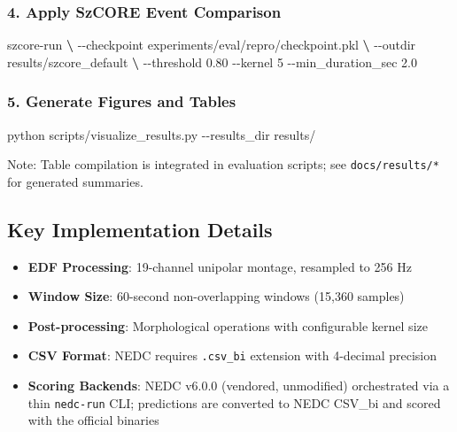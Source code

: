 \documentclass[
]{article}
\newenvironment{Shaded}{}{}
\newcommand{\ExtensionTok}[1]{#1}
\newcommand{\KeywordTok}[1]{\textcolor[rgb]{0.00,0.44,0.13}{\textbf{#1}}}
\newcommand{\NormalTok}[1]{#1}
\providecommand{\tightlist}{%
  \setlength{\itemsep}{0pt}\setlength{\parskip}{0pt}}
\begin{document}
\hypertarget{apply-szcore-event-comparison}{%
\subsubsection{4. Apply SzCORE Event
Comparison}\label{apply-szcore-event-comparison}}

\begin{Shaded}
\begin{Highlighting}[]
\ExtensionTok{szcore{-}run} \KeywordTok{\textbackslash{}}
  \ExtensionTok{{-}{-}checkpoint}\NormalTok{ experiments/eval/repro/checkpoint.pkl }\KeywordTok{\textbackslash{}}
  \ExtensionTok{{-}{-}outdir}\NormalTok{ results/szcore\_default }\KeywordTok{\textbackslash{}}
  \ExtensionTok{{-}{-}threshold}\NormalTok{ 0.80 {-}{-}kernel 5 {-}{-}min\_duration\_sec 2.0}
\end{Highlighting}
\end{Shaded}

\hypertarget{generate-figures-and-tables}{%
\subsubsection{5. Generate Figures and
Tables}\label{generate-figures-and-tables}}

\begin{Shaded}
\begin{Highlighting}[]
\ExtensionTok{python}\NormalTok{ scripts/visualize\_results.py {-}{-}results\_dir results/}
\end{Highlighting}
\end{Shaded}

Note: Table compilation is integrated in evaluation scripts; see
\texttt{docs/results/*} for generated summaries.

\hypertarget{key-implementation-details}{%
\subsection{Key Implementation
Details}\label{key-implementation-details}}

\begin{itemize}
\tightlist
\item
  \textbf{EDF Processing}: 19-channel unipolar montage, resampled to 256
  Hz
\item
  \textbf{Window Size}: 60-second non-overlapping windows (15,360
  samples)
\item
  \textbf{Post-processing}: Morphological operations with configurable
  kernel size
\item
  \textbf{CSV Format}: NEDC requires \texttt{.csv\_bi} extension with
  4-decimal precision
\item
  \textbf{Scoring Backends}: NEDC v6.0.0 (vendored, unmodified)
  orchestrated via a thin \texttt{nedc-run} CLI; predictions are
  converted to NEDC CSV\_bi and scored with the official binaries
\end{itemize}
\end{document}
